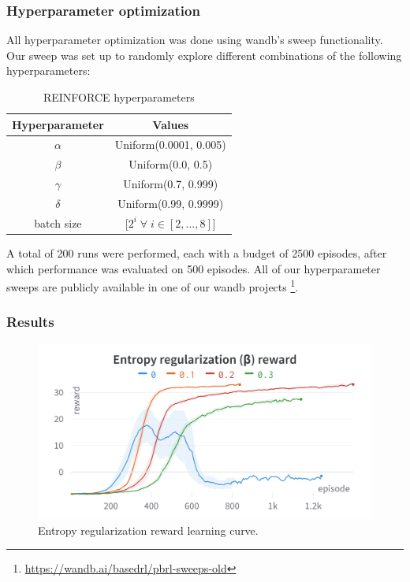 \documentclass{article}
\begin{document}
\subsubsection{Hyperparameter optimization}
\label{R-HPO}

All hyperparameter optimization was done using wandb's sweep functionality.
Our sweep was set up to randomly explore different combinations of the following hyperparameters:

\begin{table}[H]
    \centering
    \begin{tabular}{|c|c|}
        \hline
        \textbf{Hyperparameter} & \textbf{Values} \\
        \hline
        $\alpha$ & Uniform(0.0001, 0.005) \\
        $\beta$ & Uniform(0.0, 0.5) \\
        $\gamma$ & Uniform(0.7, 0.999) \\
        $\delta$ & Uniform(0.99, 0.9999) \\
        batch size & [$2^i \; \forall \; i \in [2, ..., 8]$] \\
        \hline
    \end{tabular}
    \caption{REINFORCE hyperparameters}
    \label{tab:my_label}
\end{table}

A total of 200 runs were performed, each with a budget of 2500 episodes, after which performance was evaluated on 500 episodes.
All of our hyperparameter sweeps are publicly available in one of our wandb projects \footnote{\url{https://wandb.ai/basedrl/pbrl-sweeps-old}}.

\subsubsection{Results}
\label{R-Results}

\begin{figure}[htbp]
    \centering
    \includegraphics[width=\linewidth]{figs/ER-R.png}
    \caption{Entropy regularization reward learning curve.}
    \label{fig:er-r}
\end{figure}
\end{document}
